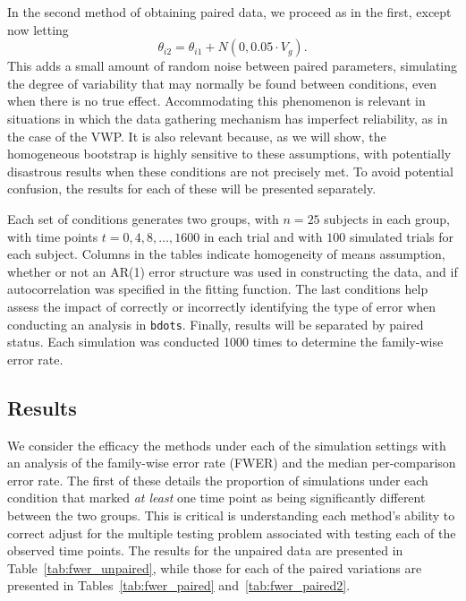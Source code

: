 \documentclass{article}
\newcommand{\xt}{\texttt}
\begin{document}
In the second method of obtaining paired data, we proceed as in the first, except now letting
\begin{equation}
\theta_{i2} = \theta_{i1} + N(0, 0.05 \cdot  V_g).
\end{equation}
This adds a small amount of random noise between paired parameters, simulating the degree of variability that may normally be found between conditions, even when there is no true effect. Accommodating this phenomenon is relevant in situations in which the data gathering mechanism has imperfect reliability, as in the case of the VWP. It is also relevant because, as we will show, the homogeneous bootstrap is highly sensitive to these assumptions, with potentially disastrous results when these conditions are not precisely met. To avoid potential confusion, the results for each of these will be presented separately.


Each set of conditions generates two groups, with $n = 25$ subjects in each group, with time points $t = 0, 4, 8, \dots, 1600$ in each trial and with $100$ simulated trials for each subject. Columns in the tables indicate homogeneity of means assumption, whether or not an AR(1) error structure was used in constructing the data, and if autocorrelation was specified in the fitting function. The last conditions help assess the impact of correctly or incorrectly identifying the type of error when conducting an analysis in \xt{bdots}. Finally, results will be separated by paired status. Each simulation was conducted 1000 times to determine the family-wise error rate. 


\subsection{Results}

We consider the efficacy the methods under each of the simulation settings with an analysis of the family-wise error rate (FWER) and the median per-comparison error rate. The first of these details the proportion of simulations under each condition that marked \textit{at least} one time point as being significantly different between the two groups. This is critical is understanding each method's ability to correct adjust for the multiple testing problem associated with testing each of the observed time points. The results for the unpaired data are presented in Table~\ref{tab:fwer_unpaired}, while those for each of the paired variations are presented in Tables~\ref{tab:fwer_paired} and~\ref{tab:fwer_paired2}.
\end{document}
